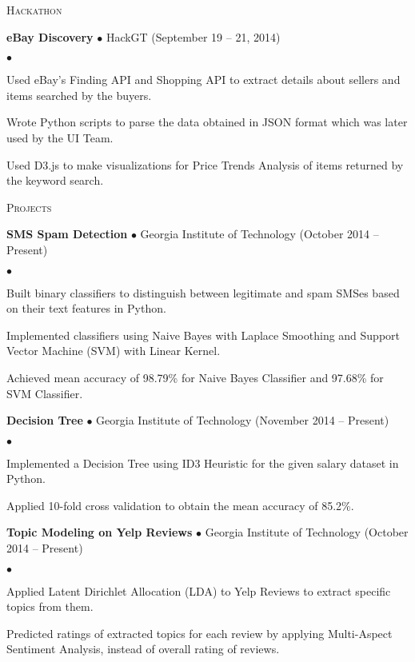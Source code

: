 \documentclass[10pt]{article}
\newcommand{\lineunder}{\\\vspace{-9pt}\hrulefill}
\newcommand{\header}[1]{{\normalsize\scshape{#1}} \lineunder}
\newcommand{\project}[3]{{ \textbf{#1} $\bullet$ #2 \hfill (#3)\\  }}
\newenvironment{achievements}{\begin{list}{$\bullet$}{\topsep 0pt \itemsep 0pt}}{\end{list}}
\begin{document}
\vspace{3pt}

\header{Hackathon}

\project{eBay Discovery}{HackGT}{September 19 -- 21, 2014}
	\begin{achievements}
	\item Used eBay's Finding API and Shopping API to extract details about sellers and items searched by the buyers.
	\item Wrote Python scripts to parse the data obtained in JSON format which was later used by the UI Team.
	\item Used D3.js to make visualizations for Price Trends Analysis of items returned by the keyword search.
	\end{achievements}	
	
\vspace{3pt}

\header{Projects}

\project{SMS Spam Detection}{Georgia Institute of Technology}{October 2014 -- Present}
	\begin{achievements}
	\item Built binary classifiers to distinguish between legitimate and spam SMSes based on their text features in Python.
	\item Implemented classifiers using Naive Bayes with Laplace Smoothing and Support Vector Machine (SVM) with Linear Kernel.
	\item Achieved mean accuracy of 98.79\% for Naive Bayes Classifier and 97.68\% for SVM Classifier.
	\end{achievements}	
	
\project{Decision Tree}{Georgia Institute of Technology}{November 2014 -- Present}
	\begin{achievements}
	\item Implemented a Decision Tree using ID3 Heuristic for the given salary dataset in Python.
	\item Applied 10-fold cross validation to obtain the mean accuracy of 85.2\%.
	\end{achievements}	
	
\project{Topic Modeling on Yelp Reviews}{Georgia Institute of Technology}{October 2014 -- Present}
	\begin{achievements}
	\item Applied Latent Dirichlet Allocation (LDA) to Yelp Reviews to extract specific topics from them.
	\item Predicted ratings of extracted topics for each review by applying Multi-Aspect Sentiment Analysis, instead of overall rating of reviews.
	\end{achievements}	
	
\end{document}
